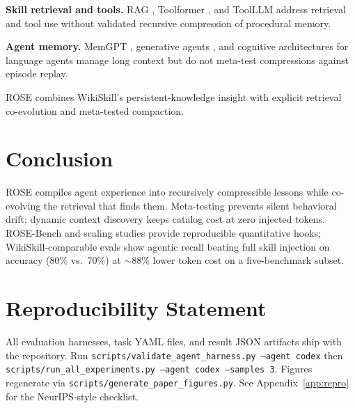 \documentclass[11pt]{article}
\begin{document}
\textbf{Skill retrieval and tools.} RAG \citep{lewis2020rag}, Toolformer \citep{schick2024toolformer}, and ToolLLM \citep{qin2023toolllm} address retrieval and tool use without validated recursive compression of procedural memory.

\textbf{Agent memory.} MemGPT \citep{packer2023memgpt}, generative agents \citep{park2023generative}, and cognitive architectures for language agents \citep{sumers2024cognitive} manage long context but do not meta-test compressions against episode replay.

ROSE combines WikiSkill's persistent-knowledge insight with explicit retrieval co-evolution and meta-tested compaction.

\section{Conclusion}
\label{sec:conclusion}

ROSE compiles agent experience into recursively compressible lessons while co-evolving the retrieval that finds them.
Meta-testing prevents silent behavioral drift; dynamic context discovery keeps catalog cost at zero injected tokens.
ROSE-Bench and scaling studies provide reproducible quantitative hooks; WikiSkill-comparable evals show agentic recall beating full skill injection on accuracy (80\% vs.\ 70\%) at $\sim$88\% lower token cost on a five-benchmark subset.

\section*{Reproducibility Statement}

All evaluation harnesses, task YAML files, and result JSON artifacts ship with the repository.
Run \texttt{scripts/validate\_agent\_harness.py --agent codex} then \texttt{scripts/run\_all\_experiments.py --agent codex --samples 3}.
Figures regenerate via \texttt{scripts/generate\_paper\_figures.py}.
See Appendix~\ref{app:repro} for the NeurIPS-style checklist.




\appendix

\end{document}
